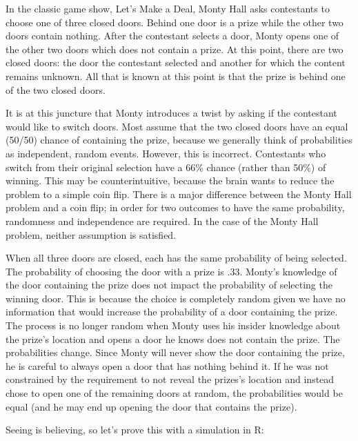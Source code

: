 \documentclass[]{book}
\begin{document}
In the classic game show, Let's Make a Deal, Monty Hall asks contestants to choose one of three closed doors. Behind one door is a prize while the other two doors contain nothing. After the contestant selects a door, Monty opens one of the other two doors which does not contain a prize. At this point, there are two closed doors: the door the contestant selected and another for which the content remains unknown. All that is known at this point is that the prize is behind one of the two closed doors.

It is at this juncture that Monty introduces a twist by asking if the contestant would like to switch doors. Most assume that the two closed doors have an equal (50/50) chance of containing the prize, because we generally think of probabilities as independent, random events. However, this is incorrect. Contestants who switch from their original selection have a 66\% chance (rather than 50\%) of winning. This may be counterintuitive, because the brain wants to reduce the problem to a simple coin flip. There is a major difference between the Monty Hall problem and a coin flip; in order for two outcomes to have the same probability, randomness and independence are required. In the case of the Monty Hall problem, neither assumption is satisfied.

When all three doors are closed, each has the same probability of being selected. The probability of choosing the door with a prize is .33. Monty's knowledge of the door containing the prize does not impact the probability of selecting the winning door. This is because the choice is completely random given we have no information that would increase the probability of a door containing the prize. The process is no longer random when Monty uses his insider knowledge about the prize's location and opens a door he knows does not contain the prize. The probabilities change. Since Monty will never show the door containing the prize, he is careful to always open a door that has nothing behind it. If he was not constrained by the requirement to not reveal the prizes's location and instead chose to open one of the remaining doors at random, the probabilities would be equal (and he may end up opening the door that contains the prize).

Seeing is believing, so let's prove this with a simulation in R:
\end{document}
